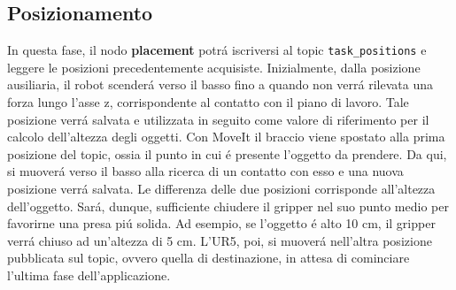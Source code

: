\subsection{Posizionamento} \label{sub:placement}
In questa fase, il nodo \textbf{placement}\footnotemark{} potr\'{a} iscriversi al topic \verb|task_positions| e leggere le posizioni precedentemente 
acquisiste. Inizialmente, dalla posizione ausiliaria, il robot scender\'{a} verso il basso fino a quando non verr\'{a} rilevata 
una forza lungo l'asse z, corrispondente al contatto con il piano di lavoro. Tale posizione verr\'{a} salvata e utilizzata in seguito 
come valore di riferimento per il calcolo dell'altezza degli oggetti. 
Con MoveIt il braccio viene spostato alla prima posizione del topic, ossia il punto in cui \'{e} presente l'oggetto da prendere.
Da qui, si muover\'{a} verso il basso alla ricerca di un contatto con esso e una nuova posizione verr\'{a} salvata. 
Le differenza delle due posizioni corrisponde all'altezza dell'oggetto. Sar\'{a}, dunque, sufficiente chiudere il gripper 
nel suo punto medio per favorirne una presa pi\'{u} solida. Ad esempio, se l'oggetto \'{e} alto 10 cm, il gripper verr\'{a} chiuso 
ad un'altezza di 5 cm. 
L'UR5, poi, si muover\'{a} nell'altra posizione pubblicata sul topic, ovvero quella di destinazione, 
in attesa di cominciare l'ultima fase dell'applicazione.
